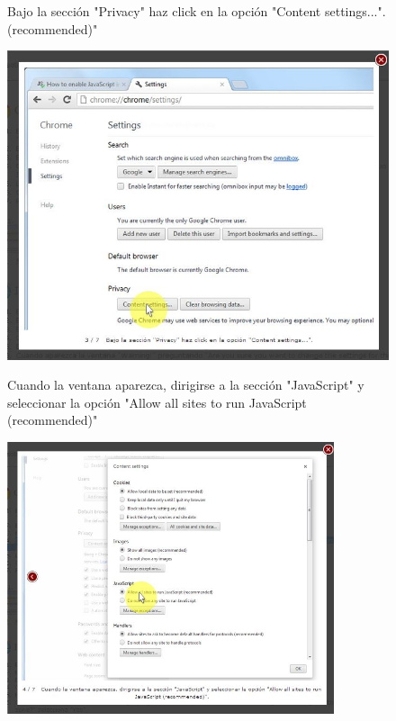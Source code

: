 \documentclass[11pt]{article} %
\begin{document}
\begin{figure}
\begin{center}
\begin{center}
Bajo la sección "Privacy" haz click en la opción "Content settings...". (recommended)"
\end{center}
\includegraphics[height=8 cm, width=8 cm] {chrome 03.jpg}

\begin{center}
Cuando la ventana aparezca, dirigirse a la sección "JavaScript" y seleccionar la opción "Allow all sites to run JavaScript (recommended)"
\end{center}

\includegraphics[height=8cm, width=8 cm] {chrome 04.jpg}

\end{center}
\end{figure}
\end{document}
